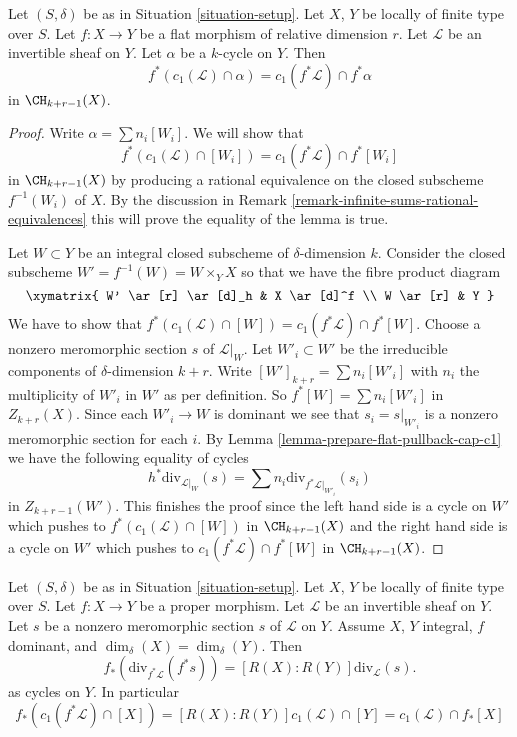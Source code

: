 \begin{lemma}
\label{lemma-flat-pullback-cap-c1}
Let $(S, \delta)$ be as in Situation \ref{situation-setup}.
Let $X$, $Y$ be locally of finite type over $S$.
Let $f : X \to Y$ be a flat morphism of relative dimension $r$.
Let $\mathcal{L}$ be an invertible sheaf on $Y$.
Let $\alpha$ be a $k$-cycle on $Y$.
Then
$$
f^*(c_1(\mathcal{L}) \cap \alpha) = c_1(f^*\mathcal{L}) \cap f^*\alpha
$$
in $\CH_{k + r - 1}(X)$.
\end{lemma}

\begin{proof}
Write $\alpha = \sum n_i[W_i]$. We will show that
$$
f^*(c_1(\mathcal{L}) \cap [W_i]) = c_1(f^*\mathcal{L}) \cap f^*[W_i]
$$
in $\CH_{k + r - 1}(X)$ by producing a rational equivalence
on the closed subscheme $f^{-1}(W_i)$ of $X$.
By the discussion in
Remark \ref{remark-infinite-sums-rational-equivalences}
this will prove the equality of the lemma is true.

\medskip\noindent
Let $W \subset Y$ be an integral closed subscheme of $\delta$-dimension $k$.
Consider the closed subscheme $W' = f^{-1}(W) = W \times_Y X$
so that we have the fibre product diagram
$$
\xymatrix{
W' \ar[r] \ar[d]_h & X \ar[d]^f \\
W \ar[r] & Y
}
$$
We have to show that
$f^*(c_1(\mathcal{L}) \cap [W]) = c_1(f^*\mathcal{L}) \cap f^*[W]$.
Choose a nonzero meromorphic section $s$ of $\mathcal{L}|_W$.
Let $W'_i \subset W'$ be the irreducible components of
$\delta$-dimension $k + r$. Write $[W']_{k + r} = \sum n_i[W'_i]$
with $n_i$ the multiplicity of $W'_i$ in $W'$ as per definition.
So $f^*[W] = \sum n_i[W'_i]$ in $Z_{k + r}(X)$.
Since each $W'_i \to W$ is dominant we
see that $s_i = s|_{W'_i}$ is a nonzero meromorphic section for
each $i$. By Lemma \ref{lemma-prepare-flat-pullback-cap-c1}
we have the following equality of cycles
$$
h^*\text{div}_{\mathcal{L}|_W}(s) =
\sum n_i\text{div}_{f^*\mathcal{L}|_{W'_i}}(s_i)
$$
in $Z_{k + r - 1}(W')$. This finishes the proof since
the left hand side is a cycle on $W'$ which pushes to
$f^*(c_1(\mathcal{L}) \cap [W])$ in $\CH_{k + r - 1}(X)$
and the right hand side is a cycle on $W'$ which pushes to
$c_1(f^*\mathcal{L}) \cap f^*[W]$ in $\CH_{k + r - 1}(X)$.
\end{proof}

\begin{lemma}
\label{lemma-equal-c1-as-cycles}
Let $(S, \delta)$ be as in Situation \ref{situation-setup}.
Let $X$, $Y$ be locally of finite type over $S$.
Let $f : X \to Y$ be a proper morphism.
Let $\mathcal{L}$ be an invertible sheaf on $Y$.
Let $s$ be a nonzero meromorphic section $s$ of $\mathcal{L}$ on $Y$.
Assume $X$, $Y$ integral, $f$ dominant, and $\dim_\delta(X) = \dim_\delta(Y)$.
Then
$$
f_*\left(\text{div}_{f^*\mathcal{L}}(f^*s)\right) =
[R(X) : R(Y)]\text{div}_\mathcal{L}(s).
$$
as cycles on $Y$. In particular
$$
f_*(c_1(f^*\mathcal{L}) \cap [X]) =
[R(X) : R(Y)] c_1(\mathcal{L}) \cap [Y] =
c_1(\mathcal{L}) \cap f_*[X]
$$
\end{lemma}

